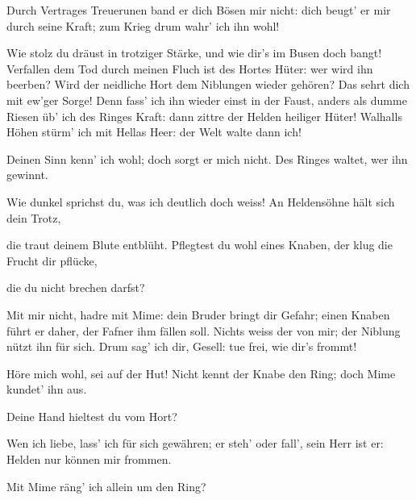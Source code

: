 \begin{drama}
\Wandererspeaks

Durch Vertrages Treuerunen
band er dich
Bösen mir nicht:
dich beugt' er mir durch seine Kraft;
zum Krieg drum wahr' ich ihn wohl!

\Alberichspeaks

Wie stolz du dräust
in trotziger Stärke,
und wie dir's im Busen doch bangt!
Verfallen dem Tod
durch meinen Fluch
ist des Hortes Hüter:
wer wird ihn beerben?
Wird der neidliche Hort
dem Niblungen wieder gehören?
Das sehrt dich mit ew'ger Sorge!
Denn fass' ich ihn wieder
einst in der Faust,
anders als dumme Riesen
üb' ich des Ringes Kraft:
dann zittre der Helden
heiliger Hüter!
Walhalls Höhen
stürm' ich mit Hellas Heer:
der Welt walte dann ich!

\Wandererspeaks


Deinen Sinn kenn' ich wohl;
doch sorgt er mich nicht.
Des Ringes waltet,
wer ihn gewinnt.

\Alberichspeaks

Wie dunkel sprichst du,
was ich deutlich doch weiss!
An Heldensöhne
hält sich dein Trotz,


die traut deinem Blute entblüht.
Pflegtest du wohl eines Knaben,
der klug die Frucht dir pflücke,


die du nicht brechen darfst?

\Wandererspeaks

Mit mir nicht,
hadre mit Mime:
dein Bruder bringt dir Gefahr;
einen Knaben führt er daher,
der Fafner ihm fällen soll.
Nichts weiss der von mir;
der Niblung nützt ihn für sich.
Drum sag' ich dir, Gesell:
tue frei, wie dir's frommt!


Höre mich wohl,
sei auf der Hut!
Nicht kennt der Knabe den Ring;
doch Mime kundet' ihn aus.

\Alberichspeaks


Deine Hand hieltest du vom Hort?

\Wandererspeaks

Wen ich liebe,
lass' ich für sich gewähren;
er steh' oder fall',
sein Herr ist er:
Helden nur können mir frommen.

\Alberichspeaks

Mit Mime räng' ich
allein um den Ring?


\end{drama}
